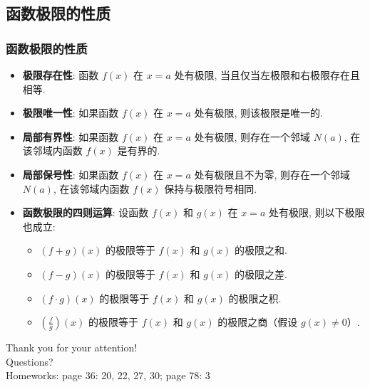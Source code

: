 \documentclass[
10pt, 
aspectratio=43, 
]{beamer}
\begin{document}
\subsection{函数极限的性质}
\begin{frame}
	\frametitle{函数极限的性质}
	
	\begin{itemize}
		\item<1-> \textbf{极限存在性}: 函数 $f(x)$ 在 $x=a$ 处有极限, 当且仅当左极限和右极限存在且相等. 
		\item<2-> \textbf{极限唯一性}: 如果函数 $f(x)$ 在 $x=a$ 处有极限, 则该极限是唯一的. 
		\item<3-> \textbf{局部有界性}: 如果函数 $f(x)$ 在 $x=a$ 处有极限, 则存在一个邻域 $N(a)$, 在该邻域内函数 $f(x)$ 是有界的. 
		\item<4-> \textbf{局部保号性}: 如果函数 $f(x)$ 在 $x=a$ 处有极限且不为零, 则存在一个邻域 $N(a)$, 在该邻域内函数 $f(x)$ 保持与极限符号相同. 
		\item<5-> \textbf{函数极限的四则运算}: 设函数 $f(x)$ 和 $g(x)$ 在 $x=a$ 处有极限, 则以下极限也成立: 
		\begin{itemize}
			\item $(f+g)(x)$ 的极限等于 $f(x)$ 和 $g(x)$ 的极限之和. 
			\item $(f-g)(x)$ 的极限等于 $f(x)$ 和 $g(x)$ 的极限之差. 
			\item $(f \cdot g)(x)$ 的极限等于 $f(x)$ 和 $g(x)$ 的极限之积. 
			\item $\left(\frac{f}{g}\right)(x)$ 的极限等于 $f(x)$ 和 $g(x)$ 的极限之商（假设 $g(x) \neq 0$）. 
		\end{itemize}
	\end{itemize}
	
\end{frame}

\begin{frame}[plain]
	\vfill
	\centering
	{
		\centering \Huge \color{white} Thank you for your attention!\\
		Questions?\\[10pt]Homeworks:  page 36:  20,  22,  27,  30; page 78:  3
		  
	}
	\vfill
\end{frame}
\end{document}
